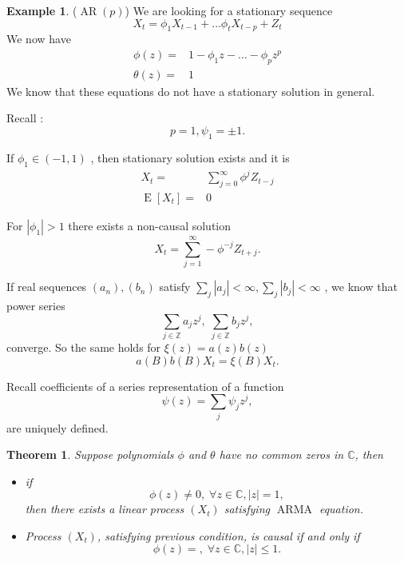 \documentclass[12pt,a4paper, notitlepage]{book}
\theoremstyle{definition} %
\newtheorem{example}{Example}[chapter]
\theoremstyle{plain} %
\newtheorem{theorem}{Theorem}
\newcommand{\Z}{\mathbb Z}
\newcommand{\C}{\mathbb C}
\DeclareMathOperator{\E}{E}
\DeclareMathOperator{\Arma}{ARMA}
\DeclareMathOperator{\Ar}{AR}
\begin{document}
\begin{example} ($ \Ar(p) $)
We are looking for a stationary sequence 
\[ X_t = \phi _1 X_{t-1} + \ldots \phi _t X_{t-p} + Z_t  \]
We now have
\begin{align*}
\phi(z) = & 1 - \phi _1 z - \ldots - \phi _p z^p \\
\theta(z)  = & 1 
\end{align*}
We know that these equations do not have a stationary solution in general.

Recall : 
\[p=1, \psi _1 = \pm 1 . \]

If $ \phi _1 \in (-1, 1) $ , then stationary solution exists and it is 
\begin{align*} 
X_t = & \sum _{j=0} ^{\infty} \phi ^j Z_{t-j}  \\
\E[X_t] = & 0
\end{align*}

For $ | \phi _1 | >1 $ there exists a non-causal solution 
\[ X_t = \sum _{j=1} ^{\infty} - \phi ^{-j} Z_{t+j} . \] 


\end{example}


If real sequences $ (a_n), (b_n) $ satisfy $ \sum_j |a_j| < \infty , \sum _j |b_j| < \infty $ , 
we know that power series 
\[ \sum _{j \in \Z} a_j z^j , \; \sum _{j \in \Z} b_j z^j , \]
converge. So the same holds for 
$\xi (z) = a(z) b(z)$ 
\[ a(B) b(B) X_t = \xi (B) X_t . \]


Recall coefficients of a series representation of a function
\[ \psi (z) = \sum _j \psi _j z^j ,  \]
are uniquely defined.


\begin{theorem}
Suppose polynomials $ \phi $ and $ \theta $ have no common zeros in $ \C$, then 
\begin{itemize}
\item if \[ \phi (z) \neq 0 , \; \forall z \in \C , |z| = 1 , \]
then there exists a linear process $ (X_t) $ satisfying $ \Arma$ equation. 
\item Process $ (X_t) $, satisfying previous condition, is causal if and only if 
\[ \phi (z) = , \; \forall z \in \C, |z| \leq 1 . \label{eq:4i} \]
\end{itemize}
\end{theorem}
\end{document}

